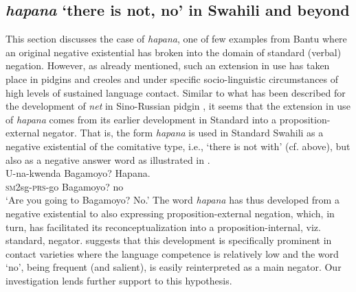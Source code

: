 \documentclass[output=paper]{langsci/langscibook}
\begin{document}
\subsection{\textit{hapana} `there is not, no' in Swahili and beyond}\label{sec:1:6.4}
%
This section discusses the case of \textit{hapana}, one of few examples
from Bantu where an original negative existential has broken into the
domain of standard (verbal) negation. However, as already mentioned, such
an extension in use has taken place in pidgins and creoles and under
specific socio-linguistic circumstances of high levels of sustained
language contact. Similar to what has been described for the development of
 \textit{net} in Sino-Russian pidgin
\parencites{Veselinova2013}{Veselinova2016}, it seems that the extension in use
of \textit{hapana} comes from its earlier development in Standard
  into a pro\-po\-si\-tion-ex\-ter\-nal negator. That is, the form \textit{hapana} is used in Standard Swahili as a negative existential of the comitative type, i.e., `there is not with' (cf.  above), but also as a negative answer word as illustrated in .
%
\ea\label{ex:swahili-bagamoyo}
\\
\gll U-na-kwenda Bagamoyo? Hapana.\\
	\textsc{sm}2sg-\textsc{prs}-go Bagamoyo? no\\
\glt 	`Are you going to Bagamoyo? No.'
\z
%
The word \textit{hapana} has thus developed from a negative existential to
also expressing proposition-external negation, which, in turn, has
facilitated its reconceptualization into a proposition-internal, viz.
standard, negator. \textcites{Veselinova2013}{Veselinova2016} suggests that this
development is specifically prominent in contact varieties where the
language competence is relatively low and the word `no', being frequent
(and salient), is easily reinterpreted as a main negator. Our investigation
lends further support to this hypothesis.
\end{document}
